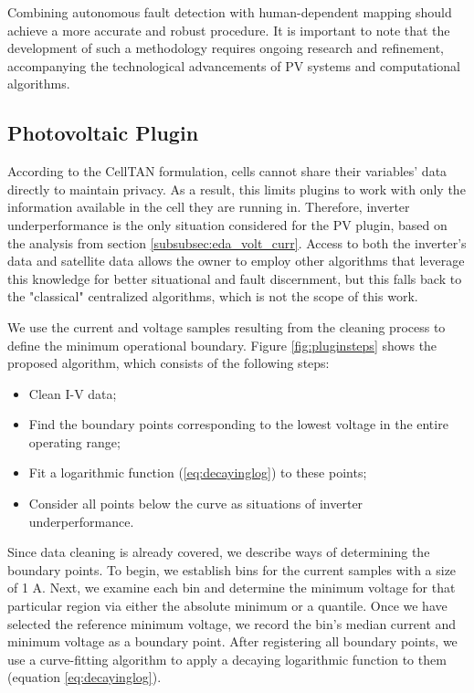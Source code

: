 Combining autonomous fault detection with human-dependent mapping should achieve a more accurate and robust procedure. It is important to note that the development of such a methodology requires ongoing research and refinement, accompanying the technological advancements of PV systems and computational algorithms.

\subsection{Photovoltaic Plugin}

According to the CellTAN formulation, cells cannot share their variables' data directly to maintain privacy. As a result, this limits plugins to work with only the information available in the cell they are running in. Therefore, inverter underperformance is the only situation considered for the PV plugin, based on the analysis from section \ref{subsubsec:eda_volt_curr}. Access to both the inverter's data and satellite data allows the owner to employ other algorithms that leverage this knowledge for better situational and fault discernment, but this falls back to the "classical" centralized algorithms, which is not the scope of this work.

We use the current and voltage samples resulting from the cleaning process to define the minimum operational boundary. Figure \ref{fig:pluginsteps} shows the proposed algorithm, which consists of the following steps:

\begin{itemize}
	\item Clean I-V data;
	\item Find the boundary points corresponding to the lowest voltage in the entire operating range;
	\item Fit a logarithmic function (\ref{eq:decayinglog}) to these points;
	\item Consider all points below the curve as situations of inverter underperformance.
\end{itemize}


Since data cleaning is already covered, we describe ways of determining the boundary points.
To begin, we establish bins for the current samples with a size of 1 A. Next, we examine each bin and determine the minimum voltage for that particular region via either the absolute minimum or a quantile. Once we have selected the reference minimum voltage, we record the bin's median current and minimum voltage as a boundary point.
After registering all boundary points, we use a curve-fitting algorithm to apply a decaying logarithmic function to them (equation \ref{eq:decayinglog}).

